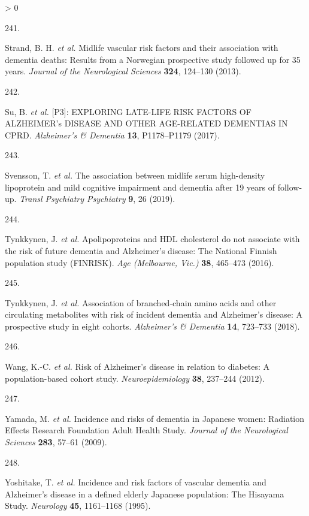 \documentclass[a4paper, twoside]{templates/ociamthesis}
\newlength{\cslhangindent}
\newlength{\csllabelwidth}
\newenvironment{CSLReferences}[3] %
 {%
  \setlength{\parindent}{0pt}
  \ifodd #1 \everypar{\setlength{\hangindent}{\cslhangindent}}\ignorespaces\fi
  \ifnum #2 > 0
  \setlength{\parskip}{#2\baselineskip}
  \fi
 }%
 {}
\newcommand{\CSLLeftMargin}[1]{\parbox[t]{\maxof{\widthof{#1}}{\csllabelwidth}}{#1}}
\newcommand{\CSLRightInline}[1]{\parbox[t]{\linewidth - \csllabelwidth}{#1}}
\begin{document}
\begin{CSLReferences}{0}{0}
\leavevmode\hypertarget{ref-strand2013}{}%
\CSLLeftMargin{241. }
\CSLRightInline{Strand, B. H. \emph{et al.} Midlife vascular risk factors and their association with dementia deaths: Results from a {Norwegian} prospective study followed up for 35 years. \emph{Journal of the Neurological Sciences} \textbf{324}, 124--130 (2013).}

\leavevmode\hypertarget{ref-su2017}{}%
\CSLLeftMargin{242. }
\CSLRightInline{Su, B. \emph{et al.} {[}{P3}{}{]}: {EXPLORING LATE}-{LIFE RISK FACTORS OF ALZHEIMER}'s {DISEASE AND OTHER AGE}-{RELATED DEMENTIAS IN CPRD}. \emph{Alzheimer's \& Dementia} \textbf{13}, P1178--P1179 (2017).}

\leavevmode\hypertarget{ref-svensson2019}{}%
\CSLLeftMargin{243. }
\CSLRightInline{Svensson, T. \emph{et al.} The association between midlife serum high-density lipoprotein and mild cognitive impairment and dementia after 19 years of follow-up. \emph{Transl Psychiatry Psychiatry} \textbf{9}, 26 (2019).}

\leavevmode\hypertarget{ref-tynkkynen2016}{}%
\CSLLeftMargin{244. }
\CSLRightInline{Tynkkynen, J. \emph{et al.} Apolipoproteins and {HDL} cholesterol do not associate with the risk of future dementia and {Alzheimer}'s disease: The {National Finnish} population study ({FINRISK}). \emph{Age (Melbourne, Vic.)} \textbf{38}, 465--473 (2016).}

\leavevmode\hypertarget{ref-tynkkynen2018}{}%
\CSLLeftMargin{245. }
\CSLRightInline{Tynkkynen, J. \emph{et al.} Association of branched-chain amino acids and other circulating metabolites with risk of incident dementia and {Alzheimer}'s disease: A prospective study in eight cohorts. \emph{Alzheimer's \& Dementia} \textbf{14}, 723--733 (2018).}

\leavevmode\hypertarget{ref-wang2012}{}%
\CSLLeftMargin{246. }
\CSLRightInline{Wang, K.-C. \emph{et al.} Risk of {Alzheimer}'s disease in relation to diabetes: A population-based cohort study. \emph{Neuroepidemiology} \textbf{38}, 237--244 (2012).}

\leavevmode\hypertarget{ref-yamada2009}{}%
\CSLLeftMargin{247. }
\CSLRightInline{Yamada, M. \emph{et al.} Incidence and risks of dementia in {Japanese} women: Radiation {Effects Research Foundation Adult Health Study}. \emph{Journal of the Neurological Sciences} \textbf{283}, 57--61 (2009).}

\leavevmode\hypertarget{ref-yoshitake1995}{}%
\CSLLeftMargin{248. }
\CSLRightInline{Yoshitake, T. \emph{et al.} Incidence and risk factors of vascular dementia and {Alzheimer}'s disease in a defined elderly {Japanese} population: The {Hisayama Study}. \emph{Neurology} \textbf{45}, 1161--1168 (1995).}


\end{CSLReferences}
\end{document}
